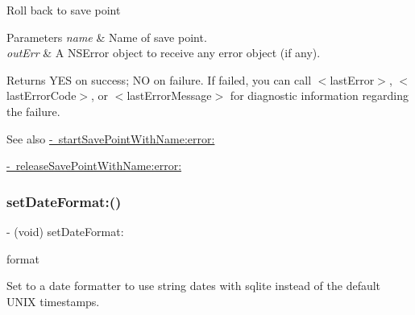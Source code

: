 Roll back to save point


\begin{DoxyParams}{Parameters}
{\em name} & Name of save point. \\
\hline
{\em out\+Err} & A {\ttfamily N\+S\+Error} object to receive any error object (if any).\\
\hline
\end{DoxyParams}
\begin{DoxyReturn}{Returns}
{\ttfamily Y\+ES} on success; {\ttfamily NO} on failure. If failed, you can call {\ttfamily $<$last\+Error$>$}, {\ttfamily $<$last\+Error\+Code$>$}, or {\ttfamily $<$last\+Error\+Message$>$} for diagnostic information regarding the failure.
\end{DoxyReturn}
\begin{DoxySeeAlso}{See also}
\mbox{\hyperlink{interface_o_p_t_l_y_f_m_d_b_database_a394534a47e9f054edfc63021f2a1ebc3}{-\/ start\+Save\+Point\+With\+Name\+:error\+:}} 

\mbox{\hyperlink{interface_o_p_t_l_y_f_m_d_b_database_afb6f13df41c3e8e1813a00f6d1ec0428}{-\/ release\+Save\+Point\+With\+Name\+:error\+:}} 
\end{DoxySeeAlso}
\mbox{\label{interface_o_p_t_l_y_f_m_d_b_database_a48c1936bc68ddd11cea9aa177b0cc94e}} 
\subsubsection{\texorpdfstring{set\+Date\+Format\+:()}{setDateFormat:()}}
{\footnotesize\ttfamily -\/ (void) set\+Date\+Format\+: \begin{DoxyParamCaption}\item[{(N\+S\+Date\+Formatter $\ast$)}]{format }\end{DoxyParamCaption}}

Set to a date formatter to use string dates with sqlite instead of the default U\+N\+IX timestamps.


